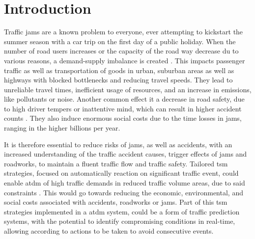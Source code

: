 \documentclass[a4paper,12pt]{report}
\begin{document}
\renewcommand\abstractname{Preliminary information and disclaimers}

\tableofcontents
\thispagestyle{empty}

\chapter{Introduction}
\setcounter{page}{1}
Traffic \glspl{jam} are a known problem to everyone, ever attempting to kickstart the summer season with a car trip on the first day of a public holiday. When the number of road users increases or the capacity of the road way decrease du to various reasons, a demand-supply imbalance is created \cite{Tang2019}. This impacts passenger traffic as well as transportation of goods in urban, suburban areas as well as highways with blocked bottlenecks and reducing travel speeds. They lead to unreliable travel times, inefficient usage of resources, and an increase in emissions, like pollutants or noise. Another common effect it a decrease in road safety, due to high driver tempers or inattentive mind, which can result in higher accident counts \cite{Sun2016}. They also induce enormous social costs due to the time losses in \glspl{jam}, ranging in the higher billions per year. \cite{RetallackOstendorf2019,BardtFritsch2014,ADAC2019}

It is therefore essential to reduce risks of \glspl{jam}, as well as accidents, with an increased understanding of the traffic accident causes, trigger effects of \glspl{jam} and roadworks, to maintain a fluent traffic flow and traffic safety. Tailored \acrfull{tsm} strategies, focused on automatically reaction on significant traffic event, could enable \acrfull{atdm} of high traffic demands in reduced traffic volume areas, due to said constraints \cite{Tang2019}. This would go towards reducing the economic, environmental, and social costs associated with accidents, roadworks or \glspl{jam}. Part of this \acrshort{tsm} strategies implemented in a \acrshort{atdm} system, could be a form of traffic prediction systems, with the potential to identify compromising conditions in real-time, allowing according to actions to be taken to avoid consecutive events. \cite{RetallackOstendorf2019} 
\end{document}
